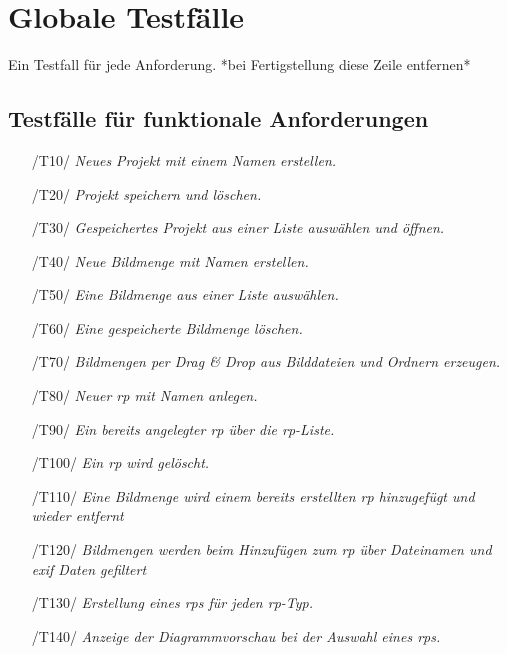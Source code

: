 \section{Globale Testfälle}

Ein Testfall für jede Anforderung. *bei Fertigstellung diese Zeile entfernen*

\subsection{Testfälle für funktionale Anforderungen}
	\begin{description}
	
\begin{itemize}
	\item[/T10/]\textit{Neues Projekt mit einem Namen erstellen.}\par
	\item[/T20/]\textit{Projekt speichern und löschen.}\par
	\item[/T30/]\textit{Gespeichertes Projekt aus einer Liste auswählen und öffnen.}\par
	\item[/T40/]\textit{Neue Bildmenge mit Namen erstellen.}\par
	\item[/T50/]\textit{Eine Bildmenge aus einer Liste auswählen.}\par
	\item[/T60/]\textit{Eine gespeicherte Bildmenge löschen.}\par
	\item[/T70/]\textit{Bildmengen per Drag \& Drop aus Bilddateien und Ordnern erzeugen.}\par
	\item[/T80/]\textit{Neuer \gls{rp} mit Namen anlegen.}\par
	\item[/T90/]\textit{Ein bereits angelegter \gls{rp} über die \gls{rp}-Liste.}\par
	\item[/T100/]\textit{Ein \gls{rp} wird gelöscht.}\par
	\item[/T110/]\textit{Eine Bildmenge wird einem bereits erstellten \gls{rp} hinzugefügt und wieder entfernt}\par
	\item[/T120/]\textit{Bildmengen werden beim Hinzufügen zum \gls{rp} über Dateinamen und \gls{exif} Daten gefiltert}\par
	\item[/T130/]\textit{Erstellung eines \gls{rp}s für jeden \gls{rp}-Typ.}\par
	\item[/T140/]\textit{Anzeige der Diagrammvorschau bei der Auswahl eines \gls{rp}s. }\par
\end{itemize}

	\end{description}
	
